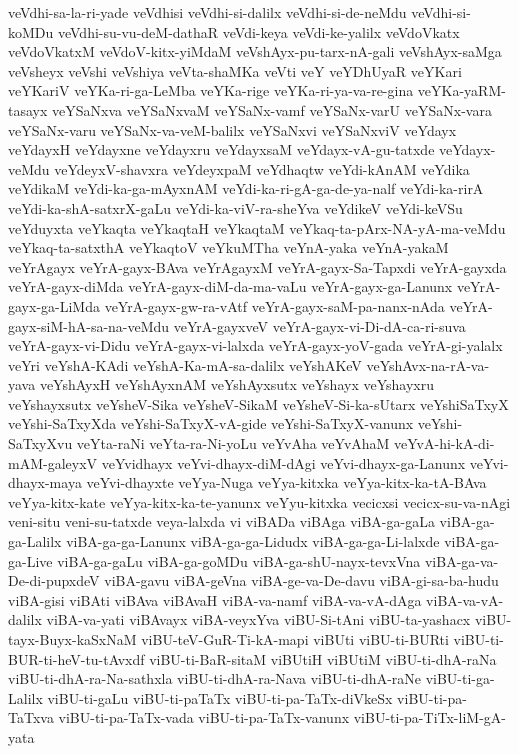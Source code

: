 {veVdhi-sa-la-ri-yade
veVdhisi
veVdhi-si-dalilx
veVdhi-si-de-neMdu
veVdhi-si-koMDu
veVdhi-su-vu-deM-dathaR
veVdi-keya
veVdi-ke-yalilx
veVdoVkatx
veVdoVkatxM
veVdoV-kitx-yiMdaM
veVshAyx-pu-tarx-nA-gali
veVshAyx-saMga
veVsheyx
veVshi
veVshiya
veVta-shaMKa
veVti
veY
veYDhUyaR
veYKari
veYKariV
veYKa-ri-ga-LeMba
veYKa-rige
veYKa-ri-ya-va-re-gina
veYKa-yaRM-tasayx
veYSaNxva
veYSaNxvaM
veYSaNx-vamf
veYSaNx-varU
veYSaNx-vara
veYSaNx-varu
veYSaNx-va-veM-balilx
veYSaNxvi
veYSaNxviV
veYdayx
veYdayxH
veYdayxne
veYdayxru
veYdayxsaM
veYdayx-vA-gu-tatxde
veYdayx-veMdu
veYdeyxV-shavxra
veYdeyxpaM
veYdhaqtw
veYdi-kAnAM
veYdika
veYdikaM
veYdi-ka-ga-mAyxnAM
veYdi-ka-ri-gA-ga-de-ya-nalf
veYdi-ka-rirA
veYdi-ka-shA-satxrX-gaLu
veYdi-ka-viV-ra-sheYva
veYdikeV
veYdi-keVSu
veYduyxta
veYkaqta
veYkaqtaH
veYkaqtaM
veYkaq-ta-pArx-NA-yA-ma-veMdu
veYkaq-ta-satxthA
veYkaqtoV
veYkuMTha
veYnA-yaka
veYnA-yakaM
veYrAgayx
veYrA-gayx-BAva
veYrAgayxM
veYrA-gayx-Sa-Tapxdi
veYrA-gayxda
veYrA-gayx-diMda
veYrA-gayx-diM-da-ma-vaLu
veYrA-gayx-ga-Lanunx
veYrA-gayx-ga-LiMda
veYrA-gayx-gw-ra-vAtf
veYrA-gayx-saM-pa-nanx-nAda
veYrA-gayx-siM-hA-sa-na-veMdu
veYrA-gayxveV
veYrA-gayx-vi-Di-dA-ca-ri-suva
veYrA-gayx-vi-Didu
veYrA-gayx-vi-lalxda
veYrA-gayx-yoV-gada
veYrA-gi-yalalx
veYri
veYshA-KAdi
veYshA-Ka-mA-sa-dalilx
veYshAKeV
veYshAvx-na-rA-va-yava
veYshAyxH
veYshAyxnAM
veYshAyxsutx
veYshayx
veYshayxru
veYshayxsutx
veYsheV-Sika
veYsheV-SikaM
veYsheV-Si-ka-sUtarx
veYshiSaTxyX
veYshi-SaTxyXda
veYshi-SaTxyX-vA-gide
veYshi-SaTxyX-vanunx
veYshi-SaTxyXvu
veYta-raNi
veYta-ra-Ni-yoLu
veYvAha
veYvAhaM
veYvA-hi-kA-di-mAM-galeyxV
veYvidhayx
veYvi-dhayx-diM-dAgi
veYvi-dhayx-ga-Lanunx
veYvi-dhayx-maya
veYvi-dhayxte
veYya-Nuga
veYya-kitxka
veYya-kitx-ka-tA-BAva
veYya-kitx-kate
veYya-kitx-ka-te-yanunx
veYyu-kitxka
vecicxsi
vecicx-su-va-nAgi
veni-situ
veni-su-tatxde
veya-lalxda
vi
viBADa
viBAga
viBA-ga-gaLa
viBA-ga-ga-Lalilx
viBA-ga-ga-Lanunx
viBA-ga-ga-Lidudx
viBA-ga-ga-Li-lalxde
viBA-ga-ga-Live
viBA-ga-gaLu
viBA-ga-goMDu
viBA-ga-shU-nayx-tevxVna
viBA-ga-va-De-di-pupxdeV
viBA-gavu
viBA-geVna
viBA-ge-va-De-davu
viBA-gi-sa-ba-hudu
viBA-gisi
viBAti
viBAva
viBAvaH
viBA-va-namf
viBA-va-vA-dAga
viBA-va-vA-dalilx
viBA-va-yati
viBAvayx
viBA-veyxYva
viBU-Si-tAni
viBU-ta-yashacx
viBU-tayx-Buyx-kaSxNaM
viBU-teV-GuR-Ti-kA-mapi
viBUti
viBU-ti-BURti
viBU-ti-BUR-ti-heV-tu-tAvxdf
viBU-ti-BaR-sitaM
viBUtiH
viBUtiM
viBU-ti-dhA-raNa
viBU-ti-dhA-ra-Na-sathxla
viBU-ti-dhA-ra-Nava
viBU-ti-dhA-raNe
viBU-ti-ga-Lalilx
viBU-ti-gaLu
viBU-ti-paTaTx
viBU-ti-pa-TaTx-diVkeSx
viBU-ti-pa-TaTxva
viBU-ti-pa-TaTx-vada
viBU-ti-pa-TaTx-vanunx
viBU-ti-pa-TiTx-liM-gA-yata
}
